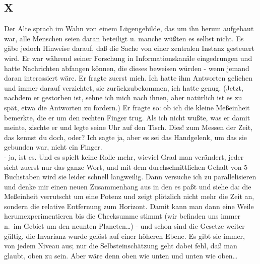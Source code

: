 \documentclass[
]{article}
\author{}
\date{\vspace{-2.5em}}
\begin{document}
\subsection{X}\label{x}

Der Alte sprach im Wahn von einem Lügengebilde, das um ihn herum
aufgebaut war, alle Menschen seien daran beteiligt u. manche wüßten es
selbst nicht. Es gäbe jedoch Hinweise darauf, daß die Sache von einer
zentralen Instanz gesteuert wird. Er war während seiner Forschung in
Informationskanäle eingedrungen und hatte Nachrichten abfangen können,
die dieses beweisen würden - wenn jemand daran interessiert wäre. Er
fragte zuerst mich. Ich hatte ihm Antworten geliehen und immer darauf
verzichtet, sie zurückzubekommen, ich hatte genug. (Jetzt, nachdem er
gestorben ist, sehne ich mich nach ihnen, aber natürlich ist es zu spät,
etwa die Antworten zu fordern.) Er fragte so: ob ich die kleine
Meßeinheit bemerkte, die er um den rechten Finger trug. Als ich nicht
wußte, was er damit meinte, zischte er und legte seine Uhr auf den
Tisch. Dies! zum Messen der Zeit, das kennst du doch, oder? Ich sagte
ja, aber es sei das Handgelenk, um das sie gebunden war, nicht ein
Finger.\\
- ja, ist es. Und es spielt keine Rolle mehr, wieviel Grad man
verändert, jeder sieht zuerst nur das ganze Wort, und mit dem
durchschnittlichen Gehalt von 5 Buchstaben wird sie leider schnell
langweilig. Dann versuche ich zu parallelisieren und denke mir einen
neuen Zusammenhang aus in den es paßt und siehe da: die Meßeinheit
verrutscht um eine Potenz und zeigt plötzlich nicht mehr die Zeit an,
sondern die relative Entfernung zum Horizont. Damit kann man dann eine
Weile herumexperimentieren bis die Checksumme stimmt (wir befinden uns
immer n.~im Gebiet um den neunten Planeten\ldots) - und schon sind die
Gesetze weiter gültig, die Invarianz wurde gelöst auf einer höheren
Ebene. Es gibt sie immer, von jedem Niveau aus; nur die
Selbsteinschätzung geht dabei fehl, daß man glaubt, oben zu sein. Aber
wäre denn oben wie unten und unten wie oben\ldots{}
\end{document}
